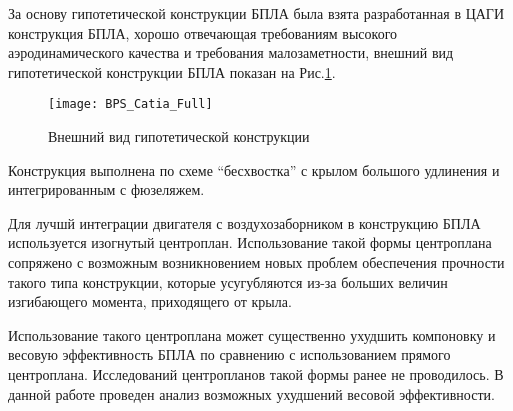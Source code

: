 



За основу гипотетической конструкции БПЛА была взята разработанная в ЦАГИ конструкция БПЛА, хорошо отвечающая требованиям высокого аэродинамического качества и требования малозаметности, внешний вид гипотетической конструкции БПЛА показан на Рис.\ref{fig:BPLA_TSAGI}.
 

  
  



\begin{figure}[ht]
\centering
\texttt{[image: BPS\_Catia\_Full]}
\caption{Внешний вид гипотетической конструкции}
\label{fig:BPLA_TSAGI}
\end{figure}

Конструкция выполнена по схеме ``бесхвостка'' с крылом большого удлинения и интегрированным с фюзеляжем. 

Для лучшй интеграции двигателя с воздухозаборником в конструкцию БПЛА используется изогнутый центроплан. Использование такой формы центроплана сопряжено с возможным возникновением новых проблем обеспечения прочности такого типа конструкции, которые усугубляются из-за больших величин изгибающего момента, приходящего от крыла. 

Использование такого центроплана может существенно ухудшить компоновку и весовую эффективность БПЛА по сравнению с использованием прямого центроплана. Исследований центропланов такой формы ранее не проводилось. В данной работе проведен анализ возможных ухудшений весовой эффективности. 
 



